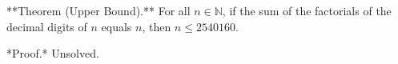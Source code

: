 
**Theorem (Upper Bound).** For all $n \in \mathbb{N}$, if the sum of the factorials of the decimal digits of $n$ equals $n$, then $n \leq 2540160$.

*Proof.* Unsolved.